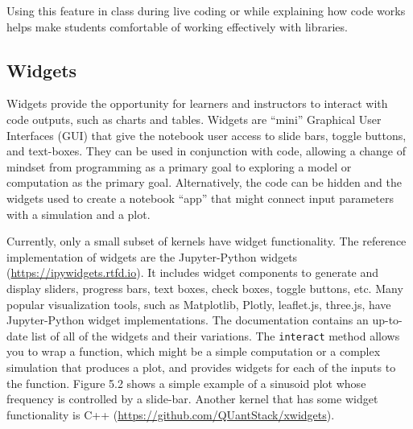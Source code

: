 \documentclass[]{book}
\begin{document}
Using this feature in class during live coding or while explaining how
code works helps make students comfortable of working effectively with
libraries.

\subsection{Widgets}\label{widgets}

Widgets provide the opportunity for learners and instructors to interact
with code outputs, such as charts and tables. Widgets are ``mini''
Graphical User Interfaces (GUI) that give the notebook user access to
slide bars, toggle buttons, and text-boxes. They can be used in
conjunction with code, allowing a change of mindset from programming as
a primary goal to exploring a model or computation as the primary goal.
Alternatively, the code can be hidden and the widgets used to create a
notebook ``app'' that might connect input parameters with a simulation
and a plot.

Currently, only a small subset of kernels have widget functionality. The
reference implementation of widgets are the Jupyter-Python widgets
(\url{https://ipywidgets.rtfd.io}). It includes widget components to
generate and display sliders, progress bars, text boxes, check boxes,
toggle buttons, etc. Many popular visualization tools, such as
Matplotlib, Plotly, leaflet.js, three.js, have Jupyter-Python widget
implementations. The documentation contains an up-to-date list of all of
the widgets and their variations. The \texttt{interact} method allows
you to wrap a function, which might be a simple computation or a complex
simulation that produces a plot, and provides widgets for each of the
inputs to the function. Figure 5.2 shows a simple example of a sinusoid
plot whose frequency is controlled by a slide-bar. Another kernel that
has some widget functionality is C++
(\url{https://github.com/QUantStack/xwidgets}).
\end{document}
